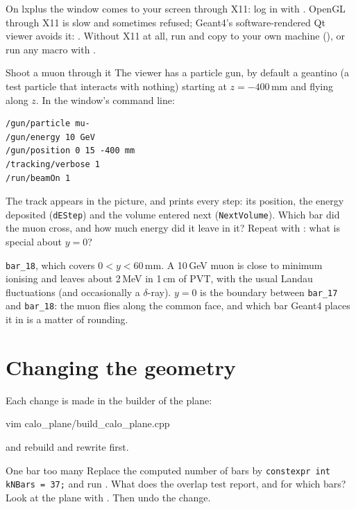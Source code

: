 \begin{pitfall}
On lxplus the window comes to your screen through X11: log in with
. OpenGL through X11 is slow and sometimes
refused; Geant4's software-rendered Qt viewer avoids it:
. Without X11 at all,
run  and copy  to your own machine
(), or run any macro with .
\end{pitfall}

\begin{exercise}{Shoot a muon through it}
\label{ex:planemuon}
The viewer has a particle gun, by default a geantino (a test particle that
interacts with nothing) starting at $z=-400$\,mm and flying along $z$. In the
window's command line:
\begin{lstlisting}[language=g4mac]
/gun/particle mu-
/gun/energy 10 GeV
/gun/position 0 15 -400 mm
/tracking/verbose 1
/run/beamOn 1
\end{lstlisting}
The track appears in the picture, and  prints every
step: its position, the energy deposited (\texttt{dEStep}) and the volume
entered next (\texttt{NextVolume}). Which bar did the muon cross, and how much
energy did it leave in it? Repeat with : what is
special about $y=0$?
\end{exercise}

\begin{solution}
\texttt{bar\_18}, which covers $0<y<60$\,mm. A 10\,GeV muon is close to
minimum ionising and leaves about 2\,MeV in 1\,cm of PVT, with the usual
Landau fluctuations (and occasionally a $\delta$-ray). $y=0$ is the boundary
between \texttt{bar\_17} and \texttt{bar\_18}: the muon flies along the
common face, and which bar Geant4 places it in is a matter of rounding.
\end{solution}

\section{Changing the geometry}

Each change is made in the builder of the plane:
\begin{shell}
vim calo_plane/build_calo_plane.cpp
\end{shell}
 and
 rebuild and rewrite  first.

\begin{exercise}{One bar too many}
\label{ex:overlap}
Replace the computed number of bars by \texttt{constexpr int kNBars = 37;}
and run . What does the overlap test report, and for
which bars? Look at the plane with . Then undo the change.
\end{exercise}

